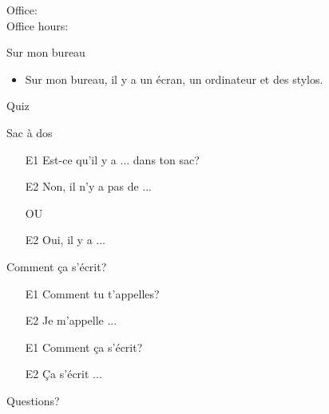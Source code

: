 \documentclass{beamer}
\subtitle[Il y a, c'est, ce sont]{Il y a, c'est, ce sont}
\begin{document}
  \begin{frame}
    \titlepage
    \tiny{Office: \\
          Office hours: }
  \end{frame}


  \begin{frame}{Sur mon bureau }
    \begin{itemize}
      \item Sur mon bureau, il y a un écran, un ordinateur et des stylos.
    \end{itemize}
  \end{frame}

  \begin{frame}{}
    \begin{center}
      \Large Quiz
    \end{center}
  \end{frame}

  \begin{frame}{Sac à dos}
    \begin{itemize}
      \item[E1] Est-ce qu'il y a ... dans ton sac?
      \item[E2] Non, il n'y a pas de ...
      \item[] OU
      \item[E2] Oui, il y a ...
    \end{itemize}
  \end{frame}

  \begin{frame}{Comment ça s'écrit? }
    \begin{itemize}
      \item[E1] Comment tu t'appelles?
      \item[E2] Je m'appelle ...
      \item[E1] Comment ça s'écrit?
      \item[E2] Ça s'écrit ...
    \end{itemize}
  \end{frame}

  \begin{frame}{}
    \begin{center}
      \Large Questions?
    \end{center}
  \end{frame}
\end{document}

